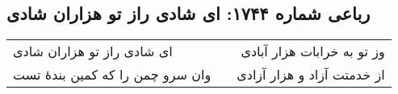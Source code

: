 \begin{center}
\section*{رباعی شماره ۱۷۴۴: ای شادی راز تو هزاران شادی}
\label{sec:1744}
\begin{longtable}{l p{0.5cm} r}
ای شادی راز تو هزاران شادی
&&
وز تو به خرابات هزار آبادی
\\
وان سرو چمن را که کمین بندهٔ تست
&&
از خدمتت آزاد و هزار آزادی
\\
\end{longtable}
\end{center}
